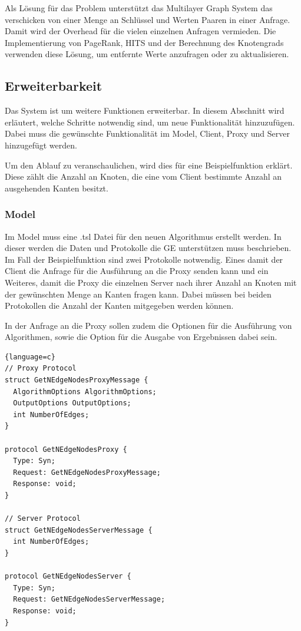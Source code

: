 Als Lösung für das Problem unterstützt das Multilayer Graph System das verschicken von einer Menge an Schlüssel und Werten Paaren in einer Anfrage. Damit wird der Overhead für die vielen einzelnen Anfragen vermieden.
Die Implementierung von PageRank, HITS und der Berechnung des Knotengrads verwenden diese Lösung, um entfernte Werte anzufragen oder zu aktualisieren.


\subsection{Erweiterbarkeit}

Das System ist um weitere Funktionen erweiterbar. In diesem Abschnitt wird erläutert, welche Schritte notwendig sind, um neue Funktionalität hinzuzufügen.
Dabei muss die gewünschte Funktionalität im Model, Client, Proxy und Server hinzugefügt werden.

Um den Ablauf zu veranschaulichen, wird dies für eine Beispielfunktion erklärt. Diese zählt die Anzahl an Knoten, die eine vom Client bestimmte Anzahl an ausgehenden Kanten besitzt.

\subsubsection{Model}

Im Model muss eine .tsl Datei für den neuen Algorithmus erstellt werden. In dieser werden die Daten und Protokolle die GE unterstützen muss beschrieben. Im Fall der Beispielfunktion sind zwei Protokolle notwendig.
Eines damit der Client die Anfrage für die Ausführung an die Proxy senden kann und ein Weiteres, damit die Proxy die einzelnen Server nach ihrer Anzahl an Knoten mit der gewünschten Menge an Kanten fragen kann.
Dabei müssen bei beiden Protokollen die Anzahl der Kanten mitgegeben werden können.

In der Anfrage an die Proxy sollen zudem die Optionen für die Ausführung von Algorithmen, sowie die Option für die Ausgabe von Ergebnissen dabei sein.

\begin{lstlisting}{language=c}
// Proxy Protocol
struct GetNEdgeNodesProxyMessage {
  AlgorithmOptions AlgorithmOptions;
  OutputOptions OutputOptions;
  int NumberOfEdges;  
}

protocol GetNEdgeNodesProxy {
  Type: Syn;
  Request: GetNEdgeNodesProxyMessage;
  Response: void;
}

// Server Protocol
struct GetNEdgeNodesServerMessage {
  int NumberOfEdges;
}

protocol GetNEdgeNodesServer {
  Type: Syn;
  Request: GetNEdgeNodesServerMessage;
  Response: void;
}
\end{lstlisting}

